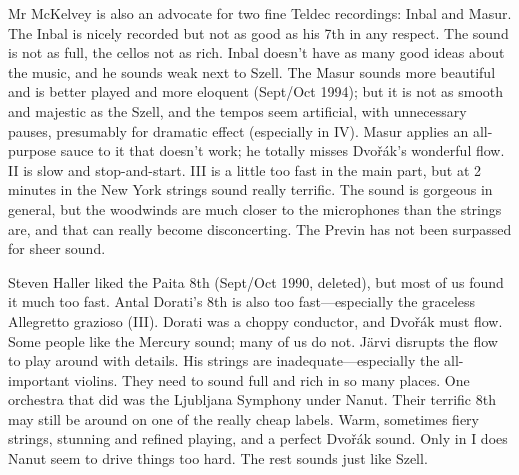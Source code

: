 \documentclass[12pt]{article}%
\begin{document}
Mr McKelvey is also an advocate for two fine Teldec recordings: Inbal and Masur. The Inbal is nicely recorded but not as good as his 7th in any respect. The sound is not as full, the cellos not as rich. Inbal doesn't have as many good ideas about the music, and he sounds weak next to Szell. The Masur sounds more beautiful and is better played and more eloquent (Sept/Oct 1994); but it is not as smooth and majestic as the Szell, and the tempos seem artificial, with unnecessary pauses, presumably for dramatic effect (especially in IV).
Masur applies an all-purpose sauce to it that doesn't work; he totally misses Dvořák's wonderful flow. II is slow and stop-and-start. III is a little too fast in the main part, but at 2 minutes in the New York strings sound really terrific. The sound is gorgeous in general, but the woodwinds are much closer to the microphones than the strings are, and that can really become disconcerting. The Previn has not been surpassed for sheer sound.

Steven Haller liked the Paita 8th (Sept/Oct 1990, deleted), but most of us found it much too fast. Antal Dorati's 8th is also too fast---especially the graceless Allegretto grazioso (III). Dorati was a choppy conductor, and Dvořák must flow. Some people like the Mercury sound; many of us do not. Järvi disrupts the flow to play around with details. His strings are inadequate---especially the all-important violins. They need to sound full and rich in so many places. One orchestra that did was the Ljubljana Symphony under Nanut.
Their terrific 8th may still be around on one of the really cheap labels. Warm, sometimes fiery strings, stunning and refined playing, and a perfect Dvořák sound. Only in I does Nanut 
seem to drive things too hard. The rest sounds just like Szell.
\end{document}
